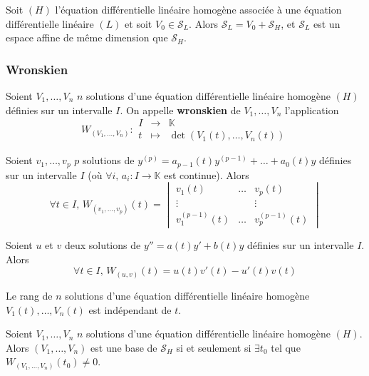 	\begin{corollary}
		Soit $(H)$ l'équation différentielle linéaire homogène associée à une équation différentielle linéaire $(L)$ et soit $V_0 \in \mathcal{S}_L$. Alors $\mathcal{S}_L = V_0 + \mathcal{S}_H$, et $\mathcal{S}_L$ est un espace affine de même dimension que $\mathcal{S}_H$.
	\end{corollary}

	\subsubsection{Wronskien}

	\begin{definition}
		Soient $V_1, \dots, V_n$ $n$ solutions d'une équation différentielle linéaire homogène $(H)$ définies sur un intervalle $I$. On appelle \textbf{wronskien} de $V_1, \dots, V_n$ l'application
		\[
		W_{(V_1, \dots, V_n)} :
		\begin{array}{ccc}
			I &\rightarrow& \mathbb{K} \\
			t &\mapsto& \det(V_1(t), \dots, V_n(t))
		\end{array}
		\]
	\end{definition}

	\begin{example}
		Soient $v_1, \dots, v_p$ $p$ solutions de $y^{(p)} = a_{p-1}(t)y^{(p-1)} + \dots + a_0(t) y$ définies sur un intervalle $I$ (où $\forall i, \, a_i : I \rightarrow \mathbb{K}$ est continue). Alors \[ \forall t \in I, \, W_{(v_1, \dots, v_p)}(t) = \begin{vmatrix} v_1(t) & \dots & v_p(t) \\ \vdots & & \vdots \\ v_1^{(p-1)}(t) & \dots & v_p^{(p-1)}(t) \end{vmatrix} \]
	\end{example}

	\begin{example}
		Soient $u$ et $v$ deux solutions de $y'' = a(t)y' + b(t)y$ définies sur un intervalle $I$. Alors \[ \forall t \in I, \, W_{(u, v)}(t) = u(t)v'(t) - u'(t)v(t) \]
	\end{example}

	\begin{proposition}
		Le rang de $n$ solutions d'une équation différentielle linéaire homogène $V_1(t), \dots, V_n(t)$ est indépendant de $t$.
	\end{proposition}

	\begin{corollary}
		Soient $V_1, \dots, V_n$ $n$ solutions d'une équation différentielle linéaire homogène $(H)$. Alors $(V_1, \dots, V_n)$ est une base de $\mathcal{S}_H$ si et seulement si $\exists t_0$ tel que $W_{(V_1, \dots, V_n)}(t_0) \neq 0$.
	\end{corollary}

